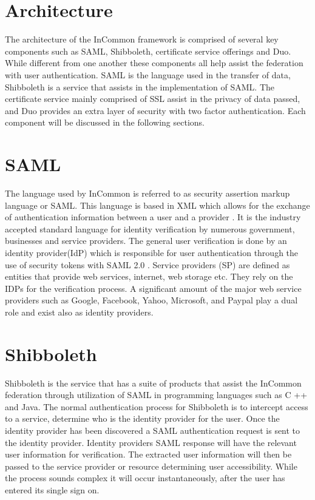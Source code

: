 \documentclass[9pt,twocolumn,twoside]{../../styles/osajnl}
\begin{document}
\section{Architecture}

The architecture of the InCommon framework is comprised of several key
components such as SAML, Shibboleth, certificate service offerings and
Duo.  While different from one another these components all help
assist the federation with user authentication.  SAML is the language
used in the transfer of data, Shibboleth is a service that assists in
the implementation of SAML.  The certificate service mainly comprised
of SSL assist in the privacy of data passed, and Duo provides an extra
layer of security with two factor authentication.  Each component will
be discussed in the following sections.

\section{SAML}

The language used by InCommon is referred to as security assertion
markup language or SAML.  This language is based in XML which allows
for the exchange of authentication information between a user and a
provider \cite{www-wiki}.  It is the industry accepted standard
language for identity verification by numerous  government, businesses and
service providers\cite{www-ping}.  The general user verification is done by an
identity provider(IdP) which is responsible for user authentication
through the use of security tokens with SAML 2.0
\cite{www-empower}. Service providers (SP) are defined as entities
that provide web services, internet, web storage etc.  They rely on
the IDPs for the verification process.  A significant amount of the
major web service providers such as Google, Facebook, Yahoo,
Microsoft, and Paypal play a dual role and exist also as identity
providers.

\section{Shibboleth}

Shibboleth is the service that has a suite of products that assist the
InCommon federation through utilization of SAML in programming
languages such as C ++ and Java\cite{www-shibboleth}.  The normal
authentication process for Shibboleth is to intercept access to a
service, determine who is the identity provider for the user.  Once
the identity provider has been discovered a SAML authentication
request is sent to the identity provider.  Identity providers SAML
response will have the relevant user information for verification.
The extracted user information will then be passed to the service
provider or resource determining user accessibility.  While the
process sounds complex it will occur instantaneously, after the user
has entered its single sign on.
\end{document}
